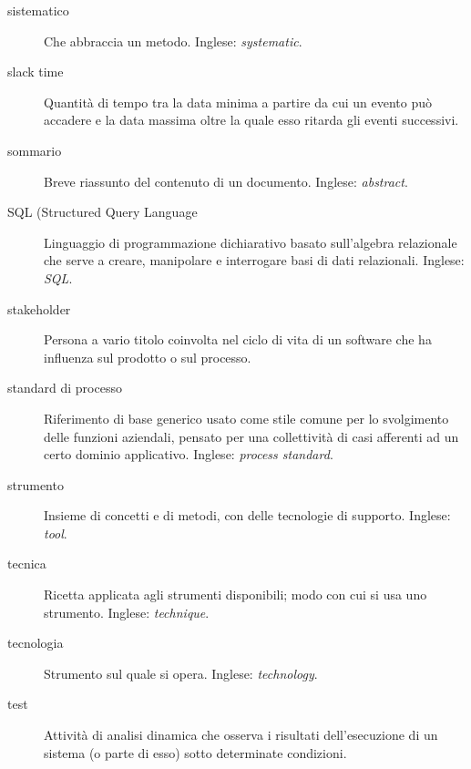 \documentclass[a4paper]{article}
\begin{document}
\begin{description}
	\item[sistematico] 

			Che abbraccia un metodo. Inglese: \emph{systematic}.
			
	\item[slack time] 

			Quantità di tempo tra la data minima a partire da cui un evento può accadere e la data massima oltre la quale esso ritarda gli eventi successivi.
			
	\item[sommario] 

			Breve riassunto del contenuto di un documento. Inglese: \emph{abstract}.
			
	\item[SQL (Structured Query Language] 

			Linguaggio di programmazione dichiarativo basato sull'algebra relazionale che serve a creare, manipolare e interrogare basi di dati relazionali. Inglese: \emph{SQL}.
			
	\item[stakeholder] 

			Persona a vario titolo coinvolta nel ciclo di vita di un software che ha influenza sul prodotto o sul processo.
			
	\item[standard di processo] 

			Riferimento di base generico usato come stile comune per lo svolgimento delle funzioni aziendali, pensato per una collettività di casi afferenti ad un certo dominio applicativo. Inglese: \emph{process standard}.
			
	\item[strumento] 

			Insieme di concetti e di metodi, con delle tecnologie di supporto. Inglese: \emph{tool}.
			
	\item[tecnica] 

			Ricetta applicata agli strumenti disponibili; modo con cui si usa uno strumento. Inglese: \emph{technique}.
			
	\item[tecnologia] 

			Strumento sul quale si opera. Inglese: \emph{technology}.
			
	\item[test] 

			Attività di analisi dinamica che osserva i risultati dell'esecuzione di un sistema (o parte di esso) sotto determinate condizioni.
			

\end{description}
\end{document}
